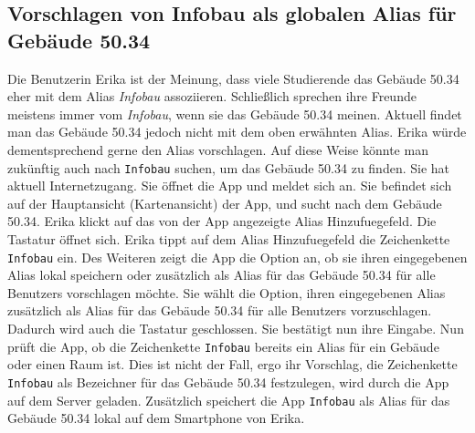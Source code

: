 \subsection{Vorschlagen von \dq Infobau\dq{} als globalen Alias für Gebäude 50.34}

Die \Gls{Benutzer}in Erika ist der Meinung, dass viele Studierende das Gebäude 50.34 eher mit dem \Gls{Alias} \textit{Infobau} assoziieren.
Schließlich sprechen ihre Freunde meistens immer vom \textit{Infobau}, wenn sie das Gebäude 50.34 meinen.
Aktuell findet man das Gebäude 50.34 jedoch nicht mit dem oben erwähnten \Gls{Alias}.
Erika würde dementsprechend gerne den \Gls{Alias} vorschlagen.
Auf diese Weise könnte man zukünftig auch nach \texttt{Infobau} suchen, um das Gebäude 50.34 zu finden.
Sie hat aktuell Internetzugang. 
Sie öffnet die App und meldet sich an. 
Sie befindet sich auf der Hauptansicht (\Gls{Kartenansicht}) der App, und sucht nach dem Gebäude 50.34.
Erika klickt auf das von der App angezeigte \Gls{Alias} \Gls{Hinzufuegefeld}. 
Die Tastatur öffnet sich.
Erika tippt auf dem \Gls{Alias} \Gls{Hinzufuegefeld} die \Gls{Zeichenkette} \texttt{Infobau} ein.
Des Weiteren zeigt die App die Option an, ob sie ihren eingegebenen \Gls{Alias} \gls{lokal} speichern oder zusätzlich als \Gls{Alias} für das Gebäude 50.34 für alle \Glspl{Benutzer} vorschlagen möchte.
Sie wählt die Option, ihren eingegebenen \Gls{Alias} zusätzlich als \Gls{Alias} für das Gebäude 50.34 für alle \Glspl{Benutzer} vorzuschlagen. 
Dadurch wird auch die Tastatur geschlossen. 
Sie bestätigt nun ihre Eingabe. 
Nun prüft die App, ob die \Gls{Zeichenkette} \texttt{Infobau} bereits ein \Gls{Alias} für ein Gebäude oder einen Raum ist. 
Dies ist nicht der Fall, ergo ihr Vorschlag, die \Gls{Zeichenkette} \texttt{Infobau} als Bezeichner für das Gebäude 50.34 festzulegen, wird durch die App auf dem \Gls{Server} geladen. 
Zusätzlich speichert die App \texttt{Infobau} als \Gls{Alias} für das Gebäude 50.34 \gls{lokal} auf dem Smartphone von Erika.
